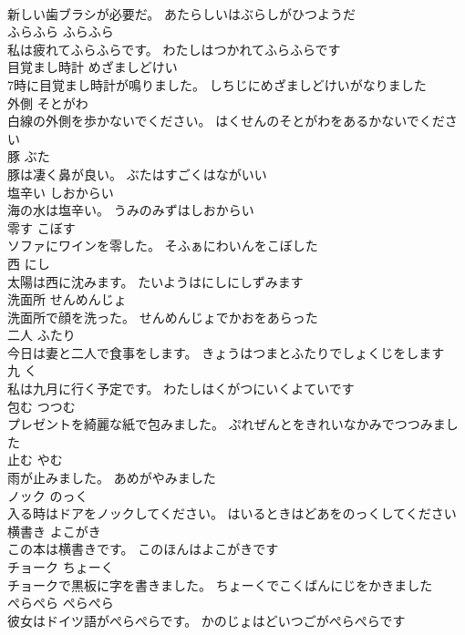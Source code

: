 \documentclass[8pt]{extreport}
\begin{document}
\begin{CJK}{UTF8}{min}
\\	新しい歯ブラシが必要だ。	あたらしいはぶらしがひつようだ	
\\	ふらふら	ふらふら	
\\	私は疲れてふらふらです。	わたしはつかれてふらふらです	
\\	目覚まし時計	めざましどけい	
\\	7時に目覚まし時計が鳴りました。	しちじにめざましどけいがなりました	
\\	外側	そとがわ	
\\	白線の外側を歩かないでください。	はくせんのそとがわをあるかないでください	
\\	豚	ぶた	
\\	豚は凄く鼻が良い。	ぶたはすごくはながいい	
\\	塩辛い	しおからい	
\\	海の水は塩辛い。	うみのみずはしおからい	
\\	零す	こぼす	
\\	ソファにワインを零した。	そふぁにわいんをこぼした	
\\	西	にし	
\\	太陽は西に沈みます。	たいようはにしにしずみます	
\\	洗面所	せんめんじょ	
\\	洗面所で顔を洗った。	せんめんじょでかおをあらった	
\\	二人	ふたり	
\\	今日は妻と二人で食事をします。	きょうはつまとふたりでしょくじをします	
\\	九	く	
\\	私は九月に行く予定です。	わたしはくがつにいくよていです	
\\	包む	つつむ	
\\	プレゼントを綺麗な紙で包みました。	ぷれぜんとをきれいなかみでつつみました	
\\	止む	やむ	
\\	雨が止みました。	あめがやみました	
\\	ノック	のっく	
\\	入る時はドアをノックしてください。	はいるときはどあをのっくしてください	
\\	横書き	よこがき	
\\	この本は横書きです。	このほんはよこがきです	
\\	チョーク	ちょーく	
\\	チョークで黒板に字を書きました。	ちょーくでこくばんにじをかきました	
\\	ぺらぺら	ぺらぺら	
\\	彼女はドイツ語がぺらぺらです。	かのじょはどいつごがぺらぺらです	

\end{CJK}
\end{document}
